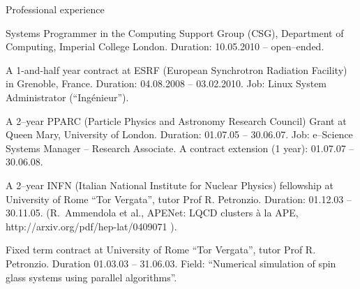 \begin{rubric}{Professional experience}

\entry*[2010--now]
Systems Programmer  in the Computing Support Group (CSG), Department
of Computing, Imperial College London. Duration: 10.05.2010 -- open--ended.

\entry*[2008--10]
A 1-and-half year contract at ESRF (European Synchrotron Radiation Facility)
in Grenoble, France. Duration: 04.08.2008 -- 03.02.2010.
Job: Linux System Administrator (``Ing\'enieur'').

\entry*[2005--8]
A 2--year PPARC (Particle Physics and Astronomy Research Council) Grant
at Queen Mary, University of London.
Duration: 01.07.05 -- 30.06.07.
Job: e--Science Systems Manager -- Research Associate.
A contract extension (1 year): 01.07.07 -- 30.06.08.


\entry*[2004--5]
A 2--year INFN (Italian National Institute for Nuclear
Physics) fellowship at University of Rome ``Tor Vergata'',
tutor Prof R. Petronzio. Duration: 01.12.03 -- 30.11.05.
(R.\ Ammendola et al., APENet: LQCD clusters \`a la APE, 
http://arxiv.org/pdf/hep-lat/0409071
).

\entry*[2003]
Fixed term contract at University of Rome ``Tor Vergata'',
tutor Prof R. Petronzio. Duration 01.03.03 -- 31.06.03.
Field: 
``Numerical simulation of spin glass systems using parallel algorithms''.

\end{rubric}
